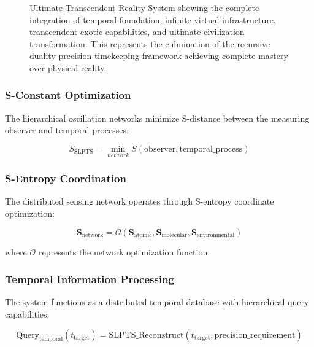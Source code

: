\documentclass[12pt,a4paper]{article}
\begin{document}
{{{{{{{{{{{{{{\begin{figure}[H]
\caption{Ultimate Transcendent Reality System showing the complete integration of temporal foundation, infinite virtual infrastructure, transcendent exotic capabilities, and ultimate civilization transformation. This represents the culmination of the recursive duality precision timekeeping framework achieving complete mastery over physical reality.}
\label{fig:transcendent_system}
\end{figure}

\subsubsection{S-Constant Optimization}

The hierarchical oscillation networks minimize S-distance between the measuring observer and temporal processes:

\begin{equation}
S_{\text{SLPTS}} = \min_{network} S(\text{observer}, \text{temporal\_process})
\end{equation}

\subsubsection{S-Entropy Coordination}

The distributed sensing network operates through S-entropy coordinate optimization:

\begin{equation}
\mathbf{S}_{\text{network}} = \mathcal{O}(\mathbf{S}_{\text{atomic}}, \mathbf{S}_{\text{molecular}}, \mathbf{S}_{\text{environmental}})
\end{equation}

where $\mathcal{O}$ represents the network optimization function.

\subsubsection{Temporal Information Processing}

The system functions as a distributed temporal database with hierarchical query capabilities:

\begin{equation}
\text{Query}_{\text{temporal}}(t_{\text{target}}) = \text{SLPTS\_Reconstruct}(t_{\text{target}}, \text{precision\_requirement})
\end{equation}

}}}}}}}}}}}}}}
\end{document}

